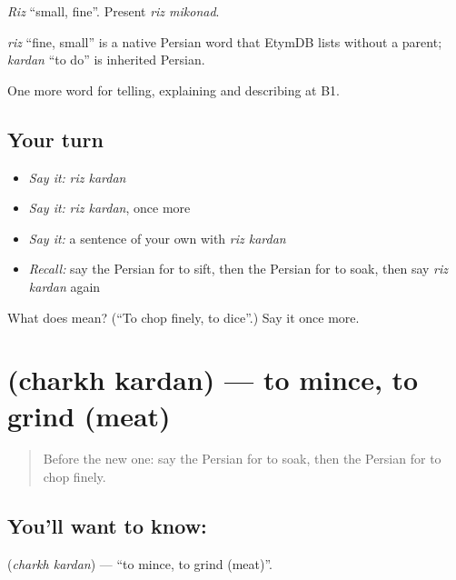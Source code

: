 \emph{Riz} \textquotedblleft{}small, fine\textquotedblright{}. Present \emph{riz mikonad}.

\begin{cousinweb}
\emph{riz} \textquotedblleft{}fine, small\textquotedblright{} is a native Persian word that EtymDB lists without a parent; \emph{kardan} \textquotedblleft{}to do\textquotedblright{} is inherited Persian.
\end{cousinweb}

\begin{grammarlens}[title={What you've built}]
One more word for telling, explaining and describing at B1.
\end{grammarlens}

\subsection*{Your turn}
\begin{itemize}
\raggedright
  \item \emph{Say it:} \emph{riz kardan}
  \item \emph{Say it:} \emph{riz kardan}, once more
  \item \emph{Say it:} a sentence of your own with \emph{riz kardan}
  \item \emph{Recall:} say the Persian for to sift, then the Persian for to soak, then say \emph{riz kardan} again
\end{itemize}

\begin{tcolorbox}[breakable,colback=teal!4,colframe=teal!35!black,title={Before you move on}]
What does   mean? (\textquotedblleft{}To chop finely, to dice\textquotedblright{}.) Say it once more.
\end{tcolorbox}
\section[\texorpdfstring{\fa{چرخ} \fa{کردن} (charkh kardan)}{چرخ کردن (charkh kardan)}]{  (charkh kardan) — to mince, to grind (meat)}

\label{lesson:FA-C356-charkh-kardan}



\begin{quote}
Before the new one: say the Persian for to soak, then the Persian for to chop finely.
\end{quote}

\subsection*{You'll want to know:  }
\textbf{ } (\emph{charkh kardan}) — \textquotedblleft{}to mince, to grind (meat)\textquotedblright{}.


